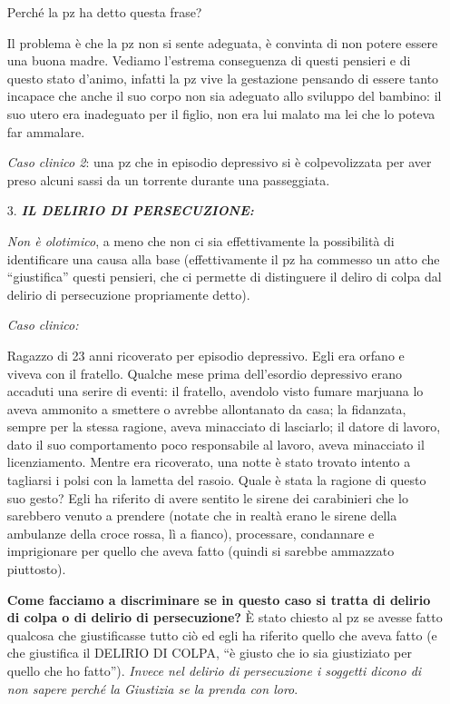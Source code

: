 \begin{itemize}
Perché la pz ha detto questa frase?

Il problema è che la pz non si sente adeguata, è convinta di non potere
essere una buona madre. Vediamo l'estrema conseguenza di questi pensieri
e di questo stato d'animo, infatti la pz vive la gestazione pensando di
essere tanto incapace che anche il suo corpo non sia adeguato allo
sviluppo del bambino: il suo utero era inadeguato per il figlio, non era
lui malato ma lei che lo poteva far ammalare.

\emph{Caso clinico 2}: una pz che in episodio depressivo si è
colpevolizzata per aver preso alcuni sassi da un torrente durante una
passeggiata.

\item[3.]
  \textbf{\emph{IL DELIRIO DI PERSECUZIONE:}}

\emph{Non è olotimico}, a meno che non ci sia effettivamente la
possibilità di identificare una causa alla base (effettivamente il pz ha
commesso un atto che ``giustifica'' questi pensieri, che ci permette di
distinguere il deliro di colpa dal delirio di persecuzione propriamente
detto).

\emph{Caso clinico:}

Ragazzo di 23 anni ricoverato per episodio depressivo. Egli era orfano e
viveva con il fratello. Qualche mese prima dell'esordio depressivo erano
accaduti una serire di eventi: il fratello, avendolo visto fumare
marjuana lo aveva ammonito a smettere o avrebbe allontanato da casa; la
fidanzata, sempre per la stessa ragione, aveva minacciato di lasciarlo;
il datore di lavoro, dato il suo comportamento poco responsabile al
lavoro, aveva minacciato il licenziamento. Mentre era ricoverato, una
notte è stato trovato intento a tagliarsi i polsi con la lametta del
rasoio. Quale è stata la ragione di questo suo gesto? Egli ha riferito
di avere sentito le sirene dei carabinieri che lo sarebbero venuto a
prendere (notate che in realtà erano le sirene della ambulanze della
croce rossa, lì a fianco), processare, condannare e imprigionare per
quello che aveva fatto (quindi si sarebbe ammazzato piuttosto).

\textbf{Come facciamo a discriminare se in questo caso si tratta di
delirio di colpa o di delirio di persecuzione?} È stato chiesto al pz se
avesse fatto qualcosa che giustificasse tutto ciò ed egli ha riferito
quello che aveva fatto (e che giustifica il DELIRIO DI COLPA, ``è giusto
che io sia giustiziato per quello che ho fatto''). \emph{Invece nel
delirio di persecuzione i soggetti dicono di non sapere perché la
Giustizia se la prenda con loro}.


\end{itemize}
